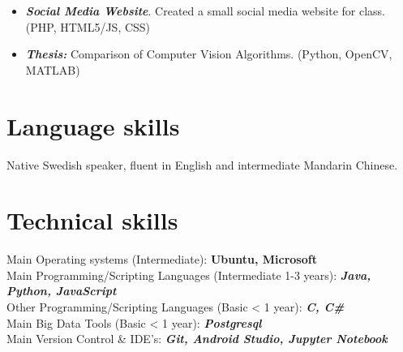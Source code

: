 \documentclass[11pt,a4paper,sans,colorlinks,linkcolor=blue,urlcolor=blue]{moderncv}
\begin{document}
{\begin{itemize}
    \setlength{\itemindent}{.25in}
    \itemsep0.3em
    \item \textit{\textbf{Social Media Website}}. Created a small social media website for class. (PHP, HTML5/JS, CSS)
\end{itemize}}

{\begin{itemize}
    \setlength{\itemindent}{.25in}
    \itemsep0.3em
    \item \textit{\textbf{Thesis:}} Comparison of Computer Vision Algorithms. (Python, OpenCV, MATLAB)
\end{itemize}}

\section{Language skills}
Native Swedish speaker, fluent in English and intermediate Mandarin Chinese.
\section{Technical skills}
Main Operating systems (Intermediate): \textbf{Ubuntu, Microsoft}
\\
{Main Programming/Scripting Languages (Intermediate 1-3 years): \textbf{\textit{Java, Python, JavaScript}}}
\\
{Other Programming/Scripting Languages (Basic < 1 year): \textbf{\textit{C, C\#}}}
\\
Main Big Data Tools (Basic < 1 year): 
\textbf{\textit{Postgresql}}
\\
Main Version Control \& IDE's: \textbf{\textit{Git, Android Studio, Jupyter Notebook}}
\\
\\
\end{document}
